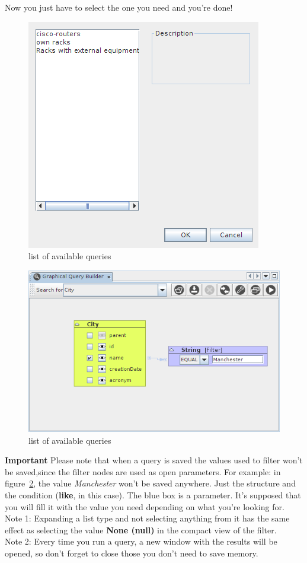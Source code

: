\documentclass[a4paper]{article}
\begin{document}
	Now you just have to select the one you need and you're done! 
	\begin{figure}[h!]
		\centering
		\includegraphics[width=0.5\linewidth]{img/query_saved_queries.png}
		\caption{list of available queries}
		\label{fig:query_saved_queries}
	\end{figure}
	
	\begin{figure}[h!]
		\centering
		\includegraphics[width=0.7\linewidth]{img/query_filter_value_not_saved.png}
		\caption{list of available queries}
		\label{fig:query_filter_value_not_saved}
	\end{figure}
	
	\begin{framed} {\large \textbf{Important}}
		Please note that when a query is saved the values used to filter won't be saved,since the filter nodes are used as open parameters. For example: in figure~\ref{fig:query_filter_value_not_saved}, the value \textit{Manchester} won't be saved anywhere. Just the structure and the condition (\textbf{like}, in this case). The blue box is a parameter. It's supposed that you will fill it with the value you need depending on what you're looking for.
		\\Note 1: Expanding a list type and not selecting anything from it has the same effect as selecting the value \textbf{None (null)} in the compact view of the filter.
		\\Note 2: Every time you run a query, a new window with the results will be opened, so don't forget to close those you don't need to save memory.
	\end{framed}
	
\end{document}
